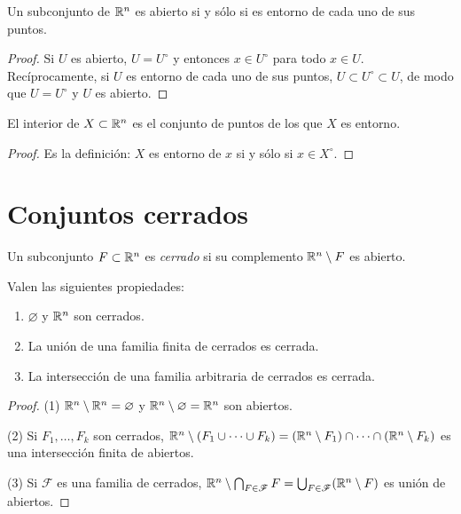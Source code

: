 \begin{prop}
  Un subconjunto de \(\mathbb{R}^n\) es abierto si y sólo si es entorno de cada uno de sus puntos.
\end{prop}

\begin{proof}
  Si \(U\) es abierto, \(U = U^{\circ}\) y entonces \(x \in U^{\circ}\) para todo \(x \in U\). Recíprocamente, si \(U\) es entorno de cada uno de sus puntos, \(U \subset U^{\circ} \subset U\), de modo que \(U = U^{\circ}\) y \(U\) es abierto.
\end{proof}

\begin{prop}
  El interior de \(X \subset \mathbb{R}^n\) es el conjunto de puntos de los que \(X\) es entorno.
\end{prop}

\begin{proof}
  Es la definición: \(X\) es entorno de \(x\) si y sólo si \(x \in X^{\circ}\).
\end{proof}

\section{Conjuntos cerrados}

\begin{definition}
  Un subconjunto \(F \subset \mathbb{R}^n\) es \emph{cerrado} si su complemento \(\mathbb{R}^n \setminus F\) es abierto.
\end{definition}

\begin{prop}
  Valen las siguientes propiedades:
  \begin{enumerate}[label=(\arabic*)]
    \item \(\varnothing\) y \(\mathbb{R}^n\) son cerrados.
    \item La unión de una familia finita de cerrados es cerrada.
    \item La intersección de una familia arbitraria de cerrados es cerrada.
  \end{enumerate}
\end{prop}

\begin{proof}
  (1) \(\mathbb{R}^n \setminus \mathbb{R}^n = \varnothing\) y \(\mathbb{R}^n \setminus \varnothing = \mathbb{R}^n\) son abiertos.

  (2) Si \(F_1, \dots, F_k\) son cerrados, \(\mathbb{R}^n \setminus (F_1 \cup \cdots \cup F_k) = (\mathbb{R}^n \setminus F_1) \cap \cdots \cap (\mathbb{R}^n \setminus F_k)\) es una intersección finita de abiertos.

  (3) Si \(\mathscr{F}\) es una familia de cerrados, \(\mathbb{R}^n \setminus \bigcap_{F \in \mathscr{F}} F = \bigcup_{F \in \mathscr{F}} (\mathbb{R}^n \setminus F)\) es unión de abiertos.
\end{proof}

